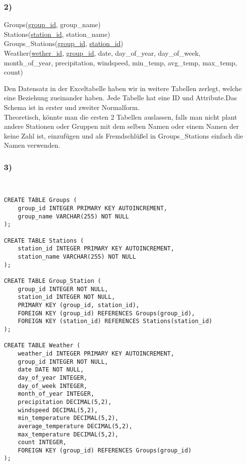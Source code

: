 \documentclass[12pt,a4paper]{article}
\begin{document}
\subsubsection{2)}
Groups(\ul{group\_id}, group\_name)\\
Stations(\ul{station\_id}, station\_name)\\
Groups\_Stations(\ul{group\_id}, \ul{station\_id})\\
Weather(\ul{wether\_id}, \ul{group\_id}, date, day\_of\_year, day\_of\_week, month\_of\_year, precipitation, windspeed, min\_temp, avg\_temp, max\_temp, count)\newline

Den Datensatz in der Exceltabelle haben wir in weitere Tabellen zerlegt, welche eine Beziehung zueinander haben. Jede Tabelle hat eine ID und Attribute.Das Schema ist in erster und zweiter Normalform. \\
Theoretisch, könnte man die ersten 2 Tabellen auslassen, falls man nicht plant andere Stationen oder Gruppen mit dem selben Namen oder einem Namen der keine Zahl ist, einzufügen und als Fremdschlüßel in Groups\_Stations einfach die Namen verwenden.


\subsubsection{3)}
\begin{verbatim}
    

CREATE TABLE Groups (
    group_id INTEGER PRIMARY KEY AUTOINCREMENT,
    group_name VARCHAR(255) NOT NULL
);

CREATE TABLE Stations (
    station_id INTEGER PRIMARY KEY AUTOINCREMENT,
    station_name VARCHAR(255) NOT NULL
);

CREATE TABLE Group_Station (
    group_id INTEGER NOT NULL,
    station_id INTEGER NOT NULL,
    PRIMARY KEY (group_id, station_id),
    FOREIGN KEY (group_id) REFERENCES Groups(group_id),
    FOREIGN KEY (station_id) REFERENCES Stations(station_id)
);

CREATE TABLE Weather (
    weather_id INTEGER PRIMARY KEY AUTOINCREMENT,
    group_id INTEGER NOT NULL,
    date DATE NOT NULL,
    day_of_year INTEGER,
    day_of_week INTEGER,
    month_of_year INTEGER,
    precipitation DECIMAL(5,2),
    windspeed DECIMAL(5,2),
    min_temperature DECIMAL(5,2),
    average_temperature DECIMAL(5,2),
    max_temperature DECIMAL(5,2),
    count INTEGER,
    FOREIGN KEY (group_id) REFERENCES Groups(group_id)
);
\end{verbatim}
\end{document}
